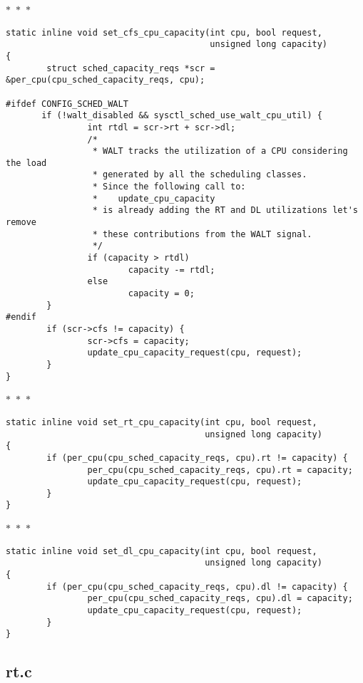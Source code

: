 \documentclass{article}
\newcommand{\divider}{{\begin{center}
  $\ast$~$\ast$~$\ast$
\end{center}}}
\begin{document}
\divider
\begin{verbatim}
static inline void set_cfs_cpu_capacity(int cpu, bool request,
                                        unsigned long capacity)
{
        struct sched_capacity_reqs *scr = &per_cpu(cpu_sched_capacity_reqs, cpu);

#ifdef CONFIG_SCHED_WALT
       if (!walt_disabled && sysctl_sched_use_walt_cpu_util) {
                int rtdl = scr->rt + scr->dl;
                /*
                 * WALT tracks the utilization of a CPU considering the load
                 * generated by all the scheduling classes.
                 * Since the following call to:
                 *    update_cpu_capacity
                 * is already adding the RT and DL utilizations let's remove
                 * these contributions from the WALT signal.
                 */
                if (capacity > rtdl)
                        capacity -= rtdl;
                else
                        capacity = 0;
        }
#endif
        if (scr->cfs != capacity) {
                scr->cfs = capacity;
                update_cpu_capacity_request(cpu, request);
        }
}
\end{verbatim}
\divider
\begin{verbatim}
static inline void set_rt_cpu_capacity(int cpu, bool request,
                                       unsigned long capacity)
{
        if (per_cpu(cpu_sched_capacity_reqs, cpu).rt != capacity) {
                per_cpu(cpu_sched_capacity_reqs, cpu).rt = capacity;
                update_cpu_capacity_request(cpu, request);
        }
}
\end{verbatim}
\divider
\begin{verbatim}
static inline void set_dl_cpu_capacity(int cpu, bool request,
                                       unsigned long capacity)
{
        if (per_cpu(cpu_sched_capacity_reqs, cpu).dl != capacity) {
                per_cpu(cpu_sched_capacity_reqs, cpu).dl = capacity;
                update_cpu_capacity_request(cpu, request);
        }
}
\end{verbatim}


\subsection{rt.c}
\end{document}
